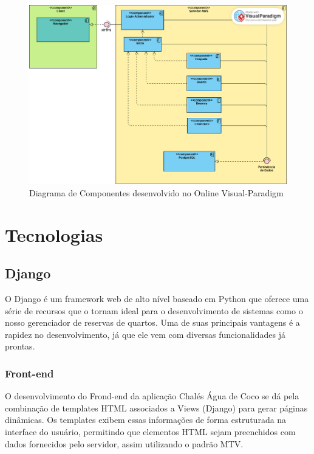 \documentclass[
	12pt,				%
	openany,			%
	twoside,			%
	a4paper,			%
	english,			%
	french,				%
	spanish,			%
	brazil				%
	]{abntex2}
\begin{document}
\begin{figure}[h!]
	\centering
	\includegraphics[width=\textwidth]{0406-Componentes.png}
	\caption{Diagrama de Componentes desenvolvido no Online Visual-Paradigm}
	\label{fig:diagramacomponentes}
\end{figure}


\section{Tecnologias}

\subsection{Django}

O Django é um framework web de alto nível baseado em Python que oferece uma série de recursos que o tornam ideal para o desenvolvimento de sistemas como o nosso gerenciador de reservas de quartos. Uma de suas principais vantagens é a rapidez no desenvolvimento, já que ele vem com diversas funcionalidades já prontas.

\subsubsection{Front-end}

O desenvolvimento do Frond-end da aplicação Chalés Água de Coco se dá pela combinação de templates HTML associados a Views (Django) para gerar páginas dinâmicas. Os templates exibem essas informações de forma estruturada na interface do usuário, permitindo que elementos HTML sejam preenchidos com dados fornecidos pelo servidor, assim utilizando o padrão MTV.
\end{document}
